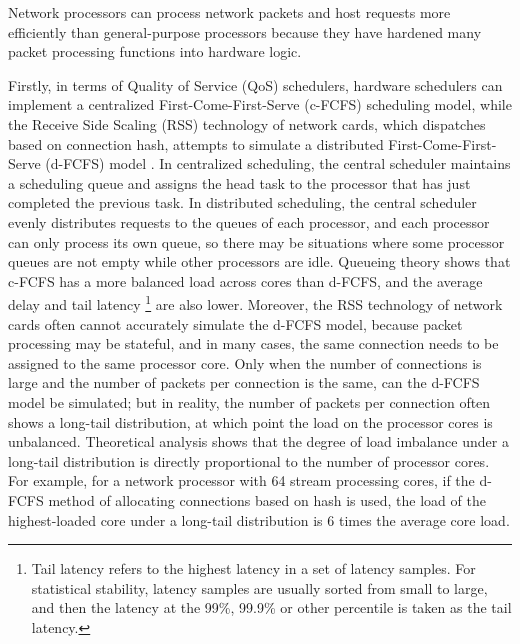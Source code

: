 Network processors can process network packets and host requests more efficiently than general-purpose processors because they have hardened many packet processing functions into hardware logic. 

Firstly, in terms of Quality of Service (QoS) schedulers, hardware schedulers can implement a centralized First-Come-First-Serve (c-FCFS) scheduling model, while the Receive Side Scaling (RSS) technology of network cards, which dispatches based on connection hash, attempts to simulate a distributed First-Come-First-Serve (d-FCFS) model \cite{kaffes2019shinjuku,ousterhout2019shenango}. In centralized scheduling, the central scheduler maintains a scheduling queue and assigns the head task to the processor that has just completed the previous task. In distributed scheduling, the central scheduler evenly distributes requests to the queues of each processor, and each processor can only process its own queue, so there may be situations where some processor queues are not empty while other processors are idle. Queueing theory shows that c-FCFS has a more balanced load across cores than d-FCFS, and the average delay and tail latency \footnote{Tail latency refers to the highest latency in a set of latency samples. For statistical stability, latency samples are usually sorted from small to large, and then the latency at the 99\%, 99.9\% or other percentile is taken as the tail latency.} are also lower. Moreover, the RSS technology of network cards often cannot accurately simulate the d-FCFS model, because packet processing may be stateful, and in many cases, the same connection needs to be assigned to the same processor core. Only when the number of connections is large and the number of packets per connection is the same, can the d-FCFS model be simulated; but in reality, the number of packets per connection often shows a long-tail distribution, at which point the load on the processor cores is unbalanced. Theoretical analysis \cite{li2017kv} shows that the degree of load imbalance under a long-tail distribution is directly proportional to the number of processor cores. For example, for a network processor with 64 stream processing cores, if the d-FCFS method of allocating connections based on hash is used, the load of the highest-loaded core under a long-tail distribution is 6 times the average core load.

